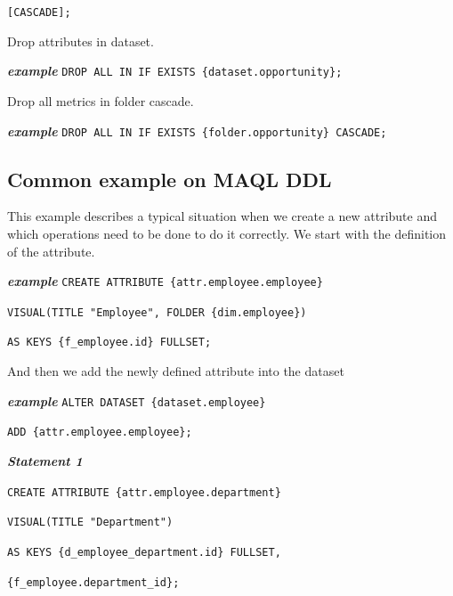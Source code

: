 \documentclass[a4paper, 12pt, titlepage, fleqn]{article}
\begin{document}
\hspace{2.1cm}\verb=[CASCADE];=

\noindent Drop attributes in dataset.

\textbf{\emph{example}}  \hspace{.9cm}\verb=DROP ALL IN IF EXISTS {dataset.opportunity};=

\noindent Drop all metrics in folder cascade.

\textbf{\emph{example}}  \hspace{.9cm}\verb=DROP ALL IN IF EXISTS {folder.opportunity} CASCADE;=

\subsection{Common example on MAQL DDL}

This example describes a typical situation when we create a new attribute and which operations need to be done to do it correctly. We start with the definition of the attribute.

\textbf{\emph{example}}  \hspace{.9cm}\verb=CREATE ATTRIBUTE {attr.employee.employee} =

\hspace{2.5cm}\verb=VISUAL(TITLE "Employee", FOLDER {dim.employee})=

\hspace{2.5cm}\verb=AS KEYS {f_employee.id} FULLSET;=

\noindent And then we add the newly defined attribute into the dataset

\textbf{\emph{example}}  \hspace{.9cm}\verb=ALTER DATASET {dataset.employee}=

\hspace{2.5cm}\verb=ADD {attr.employee.employee};=

\textbf{\emph{Statement 1}}  

\hspace{.9cm}\verb=CREATE ATTRIBUTE {attr.employee.department}=

\hspace{.9cm}\verb=VISUAL(TITLE "Department")=

\hspace{.9cm}\verb=AS KEYS {d_employee_department.id} FULLSET,=

\hspace{.9cm}\verb={f_employee.department_id};=\\
\end{document}
